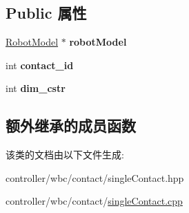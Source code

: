 \subsection*{Public 属性}
\begin{DoxyCompactItemize}
\item 
\mbox{\label{classquadruped_1_1SingleContact_a35f81f35c29337a40a3643280c2b354e}} 
\hyperlink{classquadruped_1_1RobotModel}{Robot\+Model} $\ast$ {\bfseries robot\+Model}
\item 
\mbox{\label{classquadruped_1_1SingleContact_aec067d7497b9288aec37a0a2bd22336c}} 
int {\bfseries contact\+\_\+id}
\item 
\mbox{\label{classquadruped_1_1SingleContact_afeca70250ce010f100d435143de156e5}} 
int {\bfseries dim\+\_\+cstr}
\end{DoxyCompactItemize}
\subsection*{额外继承的成员函数}


该类的文档由以下文件生成\+:\begin{DoxyCompactItemize}
\item 
controller/wbc/contact/single\+Contact.\+hpp\item 
controller/wbc/contact/\hyperlink{singleContact_8cpp}{single\+Contact.\+cpp}\end{DoxyCompactItemize}
